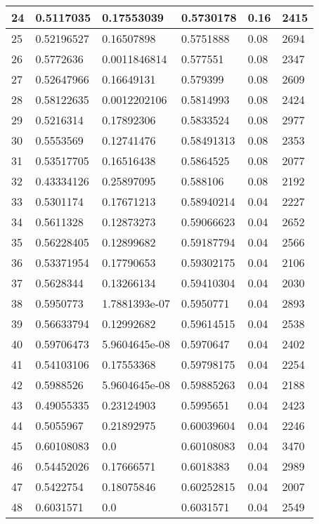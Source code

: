 \begin{longtable}{|l|l|l|l|l|l|}
24 & 0.5117035 & 0.17553039 & 0.5730178 & 0.16 & 2415 \\ \hline 
25 & 0.52196527 & 0.16507898 & 0.5751888 & 0.08 & 2694 \\ \hline 
26 & 0.5772636 & 0.0011846814 & 0.577551 & 0.08 & 2347 \\ \hline 
27 & 0.52647966 & 0.16649131 & 0.579399 & 0.08 & 2609 \\ \hline 
28 & 0.58122635 & 0.0012202106 & 0.5814993 & 0.08 & 2424 \\ \hline 
29 & 0.5216314 & 0.17892306 & 0.5833524 & 0.08 & 2977 \\ \hline 
30 & 0.5553569 & 0.12741476 & 0.58491313 & 0.08 & 2353 \\ \hline 
31 & 0.53517705 & 0.16516438 & 0.5864525 & 0.08 & 2077 \\ \hline 
32 & 0.43334126 & 0.25897095 & 0.588106 & 0.08 & 2192 \\ \hline 
33 & 0.5301174 & 0.17671213 & 0.58940214 & 0.04 & 2227 \\ \hline 
34 & 0.5611328 & 0.12873273 & 0.59066623 & 0.04 & 2652 \\ \hline 
35 & 0.56228405 & 0.12899682 & 0.59187794 & 0.04 & 2566 \\ \hline 
36 & 0.53371954 & 0.17790653 & 0.59302175 & 0.04 & 2106 \\ \hline 
37 & 0.5628344 & 0.13266134 & 0.59410304 & 0.04 & 2030 \\ \hline 
38 & 0.5950773 & 1.7881393e-07 & 0.5950771 & 0.04 & 2893 \\ \hline 
39 & 0.56633794 & 0.12992682 & 0.59614515 & 0.04 & 2538 \\ \hline 
40 & 0.59706473 & 5.9604645e-08 & 0.5970647 & 0.04 & 2402 \\ \hline 
41 & 0.54103106 & 0.17553368 & 0.59798175 & 0.04 & 2254 \\ \hline 
42 & 0.5988526 & 5.9604645e-08 & 0.59885263 & 0.04 & 2188 \\ \hline 
43 & 0.49055335 & 0.23124903 & 0.5995651 & 0.04 & 2423 \\ \hline 
44 & 0.5055967 & 0.21892975 & 0.60039604 & 0.04 & 2246 \\ \hline 
45 & 0.60108083 & 0.0 & 0.60108083 & 0.04 & 3470 \\ \hline 
46 & 0.54452026 & 0.17666571 & 0.6018383 & 0.04 & 2989 \\ \hline 
47 & 0.5422754 & 0.18075846 & 0.60252815 & 0.04 & 2007 \\ \hline 
48 & 0.6031571 & 0.0 & 0.6031571 & 0.04 & 2549 \\ \hline 

\end{longtable}
